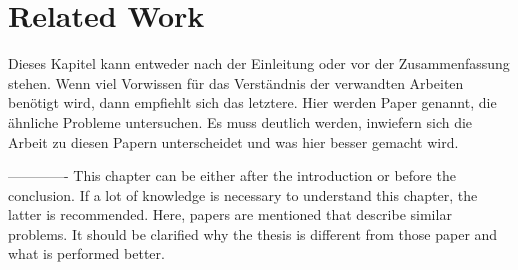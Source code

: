 \chapter{Related Work}

Dieses Kapitel kann entweder nach der Einleitung oder vor der Zusammenfassung stehen. Wenn viel Vorwissen für das Verständnis der verwandten Arbeiten benötigt wird, dann empfiehlt sich das letztere. Hier werden Paper genannt, die ähnliche Probleme untersuchen. Es muss deutlich werden, inwiefern sich die Arbeit zu diesen Papern unterscheidet und was hier besser gemacht wird.


-------------
\newline
This chapter can be either after the introduction or before the conclusion. If a lot of knowledge is necessary to understand this chapter, the latter is recommended. Here, papers are mentioned that describe similar problems. It should be clarified why the thesis is different from those paper and what is performed better.